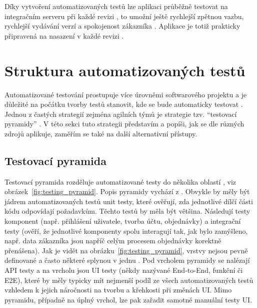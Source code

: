 Díky vytvoření automatizovaných testů lze aplikaci průběžně testovat na integračním serveru při každé revizi \cite{test-kitner}, to umožní ještě rychlejší zpětnou vazbu, rychlejší vydávání verzí a spokojenost zákazníka \cite{test-perfecto}. Aplikace je totiž prakticky připravená na nasazení v každé revizi \cite{test-atlassian}.

\section{Struktura automatizovaných testů}

Automatizované testování prostupuje více úrovněmi softwarového projektu \cite{test-kitner2} a je důležité na počátku tvorby testů stanovit, kde se bude automaticky testovat \cite{test-kitner}. Jednou z častých strategií zejména agilních týmů je strategie tzv. \enquote{testovací pyramidy} \cite{test-smartbear}. V této sekci tuto strategii představím a popíši, jak se dle různých zdrojů aplikuje, zaměřím se také na další alternativní přístupy.

\subsection{Testovací pyramida}\label{subsec:testingpyramid}

Testovací pyramida rozděluje automatizované testy do několika oblastí \cite{test-smartbear}, viz obrázek~\ref{fig:testing_pyramid}. Popis pyramidy vychází z \cite{test-kitner2, test-smartbear}. Obvykle by měly být jádrem automatizovaných testů unit testy, které ověřují, zda jednotlivé dílčí části kódu odpovídají požadavkům. Těchto testů by měla být většina. Následují testy komponent (např. přihlášení uživatele, tvorba účtu, objednávky) a integrační testy (ověří, že jednotlivé komponenty spolu interagují tak, jak bylo zamýšleno, např. data zákazníka jsou napříč celým procesem objednávky korektně přenášena). Jak je vidět na obrázku~\ref{fig:testing_pyramid}, vrstvy nejsou pevně definované a často některé splynou v jednu \cite{test-fowler}. Pod vrcholem pyramidy se nalézají API testy a na vrcholu jsou UI testy (někdy nazývané End-to-End, funkční či E2E), které by měly typicky mít nejmenší podíl ze všech automatizovaných testů vzhledem k jejich náročnosti na tvorbu a křehkosti při změnách UI. Mimo pyramidu, případně na úplný vrchol, lze pak zařadit samotné manuální testy UI.

